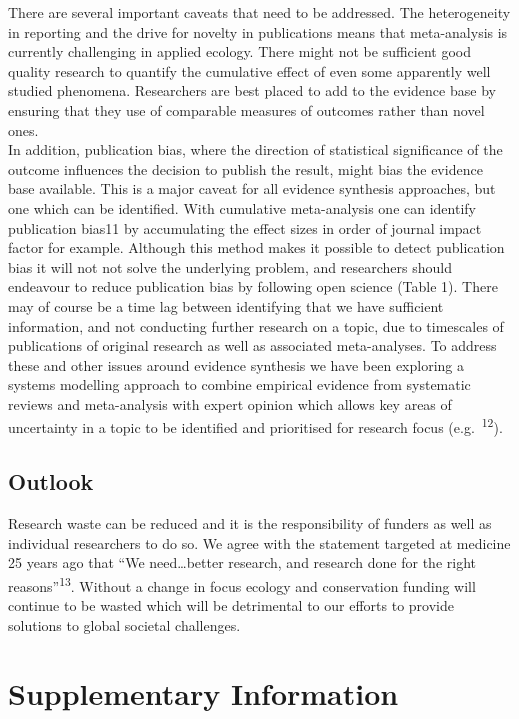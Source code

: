 \documentclass[]{article}
\begin{document}
There are several important caveats that need to be addressed. The
heterogeneity in reporting and the drive for novelty in publications
means that meta-analysis is currently challenging in applied ecology.
There might not be sufficient good quality research to quantify the
cumulative effect of even some apparently well studied phenomena.
Researchers are best placed to add to the evidence base by ensuring that
they use of comparable measures of outcomes rather than novel ones.\\
In addition, publication bias, where the direction of statistical
significance of the outcome influences the decision to publish the
result, might bias the evidence base available. This is a major caveat
for all evidence synthesis approaches, but one which can be identified.
With cumulative meta-analysis one can identify publication bias11 by
accumulating the effect sizes in order of journal impact factor for
example. Although this method makes it possible to detect publication
bias it will not not solve the underlying problem, and researchers
should endeavour to reduce publication bias by following open science
(Table 1). There may of course be a time lag between identifying that we
have sufficient information, and not conducting further research on a
topic, due to timescales of publications of original research as well as
associated meta-analyses. To address these and other issues around
evidence synthesis we have been exploring a systems modelling approach
to combine empirical evidence from systematic reviews and meta-analysis
with expert opinion which allows key areas of uncertainty in a topic to
be identified and prioritised for research focus
(e.g.~\textsuperscript{12}).

\hypertarget{outlook}{%
\subsection{Outlook}\label{outlook}}

Research waste can be reduced and it is the responsibility of funders as
well as individual researchers to do so. We agree with the statement
targeted at medicine 25 years ago that ``We need\ldots{}better research,
and research done for the right reasons''\textsuperscript{13}. Without a
change in focus ecology and conservation funding will continue to be
wasted which will be detrimental to our efforts to provide solutions to
global societal challenges.

\hypertarget{supplementary-information}{%
\section{Supplementary Information}\label{supplementary-information}}
\end{document}
